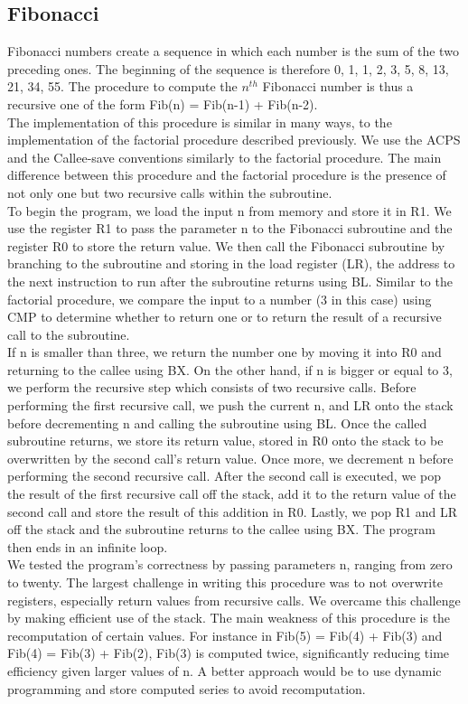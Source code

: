 \documentclass[10pt]{article}
\begin{document}
\subsection{Fibonacci}
Fibonacci numbers create a sequence in which each number is the sum of the two preceding ones. The beginning of the sequence is therefore 0, 1, 1, 2, 3, 5, 8, 13, 21, 34, 55. The procedure to compute the $n^{th}$ Fibonacci number is thus a recursive one of the form Fib(n) = Fib(n-1) + Fib(n-2).\\
The implementation of this procedure is similar in many ways, to the implementation of the factorial procedure described previously. We use the ACPS and the Callee-save conventions similarly to the factorial procedure. The main difference between this procedure and the factorial procedure is the presence of not only one but two recursive calls within the subroutine.\\
To begin the program, we load the input n from memory and store it in R1. We use the register R1 to pass the parameter n to the Fibonacci subroutine and the register R0 to store the return value. We then call the Fibonacci subroutine by branching to the subroutine and storing in the load register (LR), the address to the next instruction to run after the subroutine returns using BL.
Similar to the factorial procedure, we compare the input to a number (3 in this case) using CMP to determine whether to return one or to return the result of a recursive call to the subroutine.\\
If n is smaller than three, we return the number one by moving it into R0 and returning to the callee using BX. On the other hand, if n is bigger or equal to 3, we perform the recursive step which consists of two recursive calls. Before performing the first recursive call, we push the current n, and LR onto the stack before decrementing n and calling the subroutine using BL. Once the called subroutine returns, we store its return value, stored in R0 onto the stack to be overwritten by the second call's return value.  Once more, we decrement n before performing the second recursive call. After the second call is executed, we pop the result of the first recursive call off the stack, add it to the return value of the second call and store the result of this addition in R0. Lastly, we pop R1 and LR off the stack and the subroutine returns to the callee using BX. The program then ends in an infinite loop.\\
We tested the program's correctness by passing parameters n, ranging from zero to twenty. The largest challenge in writing this procedure was to not overwrite registers, especially return values from recursive calls. We overcame this challenge by making efficient use of the stack. The main weakness of this procedure is the recomputation of certain values. For instance in Fib(5) = Fib(4) + Fib(3) and Fib(4) = Fib(3) + Fib(2), Fib(3) is computed twice, significantly reducing time efficiency given larger values of n. A better approach would be to use dynamic programming and store computed series to avoid recomputation.
\end{document}
